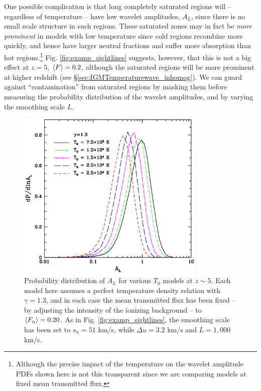 One possible complication is that long completely saturated regions will -- regardless of temperature -- have low wavelet amplitudes, $A_L$, since there
is no small scale structure in such regions. These saturated zones may in fact be {\em more prominent} in models with
low temperature since cold regions recombine more quickly, and hence have larger neutral fractions and suffer more absorption 
than hot regions.\footnote{Although the precise impact of the temperature on the wavelet amplitude PDFs shown here is not this transparent since we are comparing models at fixed
mean transmitted flux.} Fig. \ref{fig:examp_sightlines} suggests, however, that this is not a big effect at $z=5$, $\langle F \rangle=0.2$, although the saturated regions will be more prominent at higher redshift (see \S \ref{sec:IGMTemperaturewave_inhomog}). We can
guard against ``contamination'' from saturated regions by masking them before measuring the probability distribution
of the wavelet amplitudes, and by varying the smoothing scale $L$.


\begin{figure}
\bc
\includegraphics[width=9cm]{f11.eps}
\caption{Probability distribution of $A_L$ for various $T_0$ models at $z \sim 5$. Each model here assumes a perfect temperature
density relation with $\gamma=1.3$, and in each case the mean transmitted flux
has been fixed -- by adjusting the intensity of the ionizing background -- to $\langle F_\alpha \rangle=0.20$. As in Fig. \ref{fig:examp_sightlines}, 
the smoothing scale has been set to $s_n=51$ km/s, while
$\Delta u = 3.2$ km/s and $L=1,000$ km/s.}
\label{fig:pdf_amp}
\ec
\end{figure}

